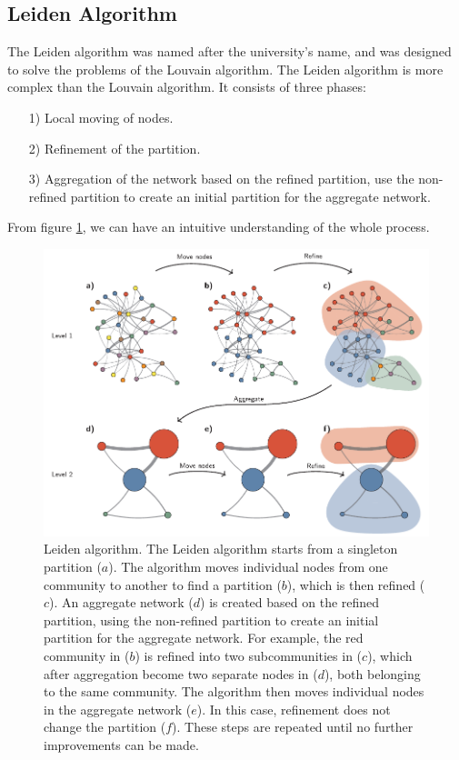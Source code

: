 \documentclass[11pt]{article}
\begin{document}
\subsection{Leiden Algorithm}
\renewcommand\arraystretch{1.5}
The Leiden algorithm was named after the university's name, and was designed to solve the problems of the Louvain algorithm.\cite{leiden}
The Leiden algorithm is more complex than the Louvain algorithm. It consists of three phases:
\begin{itemize}
  \item [1)] Local moving of nodes.
  \item [2)] Refinement of the partition.
  \item [3)] Aggregation of the network based on the refined partition, use the non-refined partition to create an initial partition for the aggregate network.
\end{itemize}
\noindent From figure \ref{fig:leiden}, we can have an intuitive understanding of the whole process.
\begin{figure}[ht]
  \centering
  \includegraphics[scale=0.6]{figures/leiden.png}
  \caption{Leiden algorithm. The Leiden algorithm starts from a singleton partition ($a$). The algorithm moves individual nodes from one community to another to find a partition ($b$), which is then refined ($c$). An aggregate network ($d$) is created based on the refined partition, using the non-refined partition to create an initial partition for the aggregate network. For example, the red community in ($b$) is refined into two subcommunities in ($c$), which after aggregation become two separate nodes in ($d$), both belonging to the same community. The algorithm then moves individual nodes in the aggregate network ($e$). In this case, refinement does not change the partition ($f$). These steps are repeated until no further improvements can be made.\cite{leiden}}
  \label{fig:leiden}
\end{figure}
\end{document}
